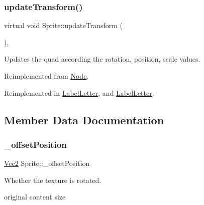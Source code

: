 \mbox{\label{classSprite_aa486a133eeb98d0872f4a71e5926aeeb}} 
\subsubsection{\texorpdfstring{update\+Transform()}{updateTransform()}\hspace{0.1cm}{\footnotesize\ttfamily [2/2]}}
{\footnotesize\ttfamily virtual void Sprite\+::update\+Transform (\begin{DoxyParamCaption}{ }\end{DoxyParamCaption})\hspace{0.3cm}{\ttfamily [override]}, {\ttfamily [virtual]}}

Updates the quad according the rotation, position, scale values. 

Reimplemented from \hyperlink{classNode_a8583decfa6069f06ec1e9f8080c1ae36}{Node}.



Reimplemented in \hyperlink{classLabelLetter_ae52821b1e8fb7782602524f23c23b3ac}{Label\+Letter}, and \hyperlink{classLabelLetter_ae52821b1e8fb7782602524f23c23b3ac}{Label\+Letter}.



\subsection{Member Data Documentation}
\mbox{\label{classSprite_af69eb91c3b11ea5f42c6143be302edb1}} 
\subsubsection{\texorpdfstring{\+\_\+offset\+Position}{\_offsetPosition}}
{\footnotesize\ttfamily \hyperlink{classVec2}{Vec2} Sprite\+::\+\_\+offset\+Position\hspace{0.3cm}{\ttfamily [protected]}}



Whether the texture is rotated. 

original content size \mbox{\label{classSprite_a56a1e71b208df002ffce86f0c8a1fe03}} 
